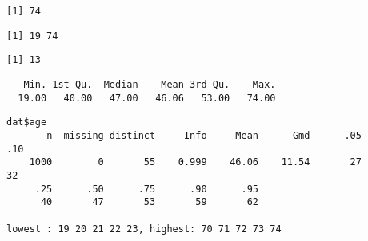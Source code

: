 \documentclass[
]{article}
\newenvironment{Shaded}{\begin{snugshade}}{\end{snugshade}}
\newcommand{\CommentTok}[1]{\textcolor[rgb]{0.56,0.35,0.01}{\textit{#1}}}
\newcommand{\FunctionTok}[1]{\textcolor[rgb]{0.00,0.00,0.00}{#1}}
\newcommand{\NormalTok}[1]{#1}
\newcommand{\SpecialCharTok}[1]{\textcolor[rgb]{0.00,0.00,0.00}{#1}}
\begin{document}
\begin{verbatim}
[1] 74
\end{verbatim}

\begin{Shaded}
\end{Shaded}

\begin{verbatim}
[1] 19 74
\end{verbatim}

\begin{Shaded}
\end{Shaded}

\begin{verbatim}
[1] 13
\end{verbatim}

\begin{Shaded}
\end{Shaded}

\begin{verbatim}
   Min. 1st Qu.  Median    Mean 3rd Qu.    Max. 
  19.00   40.00   47.00   46.06   53.00   74.00 
\end{verbatim}

\begin{Shaded}
\end{Shaded}

\begin{verbatim}
dat$age 
       n  missing distinct     Info     Mean      Gmd      .05      .10 
    1000        0       55    0.999    46.06    11.54       27       32 
     .25      .50      .75      .90      .95 
      40       47       53       59       62 

lowest : 19 20 21 22 23, highest: 70 71 72 73 74
\end{verbatim}
\end{document}
